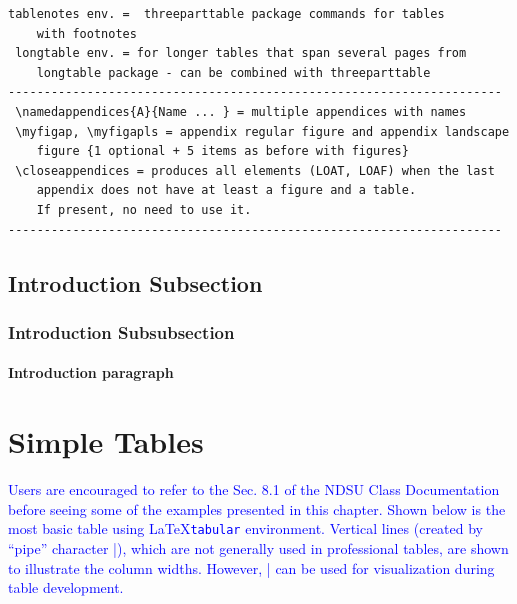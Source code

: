 \documentclass[phd,showgrids]{ndsu-thesis-2022}
\newcommand\italk[1]{\textcolor{blue}{#1}}  %
\newcommand\lx{\LaTeX\xspace}
\begin{document}
\begin{lstlisting}[basicstyle=\ttfamily\footnotesize\color{blue}]
 tablenotes env. =  threeparttable package commands for tables 
 	with footnotes 
 longtable env. = for longer tables that span several pages from 
 	longtable package - can be combined with threeparttable 
---------------------------------------------------------------------
 \namedappendices{A}{Name ... } = multiple appendices with names 
 \myfigap, \myfigapls = appendix regular figure and appendix landscape 
 	figure {1 optional + 5 items as before with figures}
 \closeappendices = produces all elements (LOAT, LOAF) when the last 
 	appendix does not have at least a figure and a table. 
	If present, no need to use it.
---------------------------------------------------------------------
\end{lstlisting}

\subsection{Introduction Subsection}
\kant[4]

\subsubsection{Introduction Subsubsection}
\kant[6]

\paragraph{Introduction paragraph}
\kant[8]



\section{Simple Tables}

\italk{Users are encouraged to refer to the Sec. 8.1 of the NDSU Class Documentation before seeing some of the examples presented in this chapter. Shown below is the most basic table using \lx \texttt{tabular} environment. Vertical lines (created by ``pipe'' character |), which are not generally used in professional tables, are shown to illustrate the column widths. However, | can be used for visualization during table development.}
\end{document}
